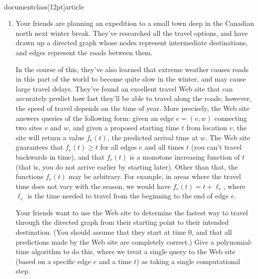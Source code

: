 \\documentclass[12pt]{article}
\begin{document}
\begin{enumerate}
{}


\item 

Your friends are planning an expedition to a small town
deep in the Canadian north next winter break.
They've researched all the travel options, and have
drawn up a directed graph whose nodes represent intermediate
destinations, and edges represent the roads between them.

In the course of this, they've also learned that extreme weather
causes roads in this part
of the world to become quite slow in the winter,
and may cause large travel delays.
They've found an excellent travel Web site that can accurately
predict how fast they'll be able to travel along the roads;
however, the speed of travel depends on the time of year.
More precisely, the Web site answers queries of the following form:
given an edge $e = (v,w)$ connecting two sites $v$ and $w$,
and given a proposed starting time $t$ from location $v$,
the site will return a value $f_e(t)$, the predicted arrival time at $w$.
The Web site guarantees that $f_e(t) \ge t$ for all edges $e$ and all
times $t$ (you can't travel backwards in time), and that
$f_e(t)$ is a monotone increasing function of $t$
(that is, you do not arrive earlier by starting later).
Other than that, the functions $f_e(t)$ may be arbitrary.
For example, in areas where the travel time does not vary with the
season, we would have $f_e(t)=t+\ell_e$, where $\ell_e$ is the time needed
to travel from the beginning to the end of edge $e$.

Your friends want to use the Web site to determine the fastest
way to travel through the directed graph
from their starting point to their intended destination.
(You should assume that they start at time $0$, and that all
predictions made by the Web site are completely correct.)
Give a polynomial-time algorithm to do this, where we treat
a single query to the Web site (based on a specific edge $e$ and a time $t$)
as taking a single computational step.

\end{enumerate}
\end{document}
